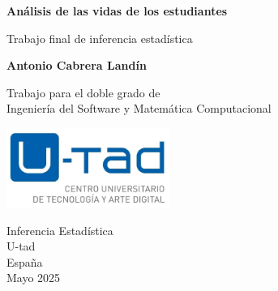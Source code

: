 \documentclass[12pt]{report}
\begin{document}
\begin{titlepage}
    \begin{center}
        \vspace*{1cm}
 
        \Large\textbf{Análisis de las vidas de los estudiantes}
 
        \vspace{0.5cm}
            Trabajo final de inferencia estadística
        \vspace{1.5cm}
 
        \textbf{Antonio Cabrera Landín}
 
        \vfill
             
        Trabajo para el doble grado de\\
        Ingeniería del Software y Matemática Computacional\\
             
        \vspace{0.8cm}
      
        \includegraphics[width=0.4\textwidth]{figures/logo-u-tad.png}
             
        Inferencia Estadística\\
        U-tad\\
        España\\
        Mayo 2025
             
    \end{center}
 \end{titlepage}

\tableofcontents

\listoffigures



\end{document}
